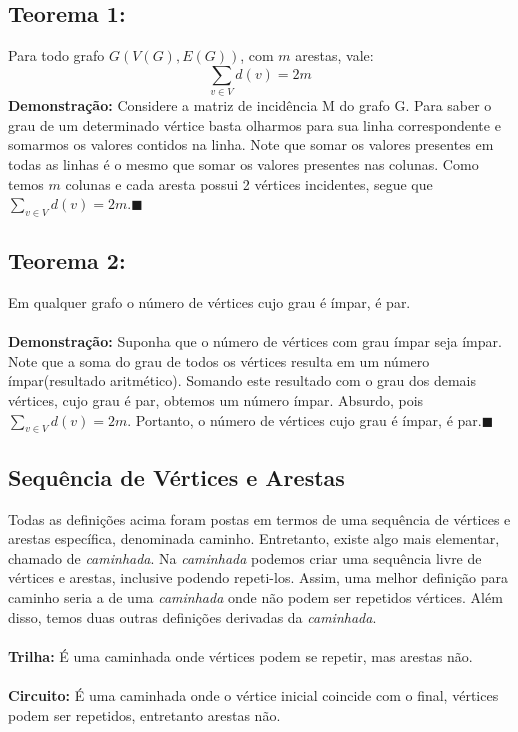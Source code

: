\documentclass[a4paper,12pt]{article}
\begin{document}
	\subsection*{Teorema 1: } Para todo grafo $G(V(G),E(G))$, com $m$ arestas, vale:
	\begin{equation}
	\sum\limits_{v\in V}{d(v)=2m}
	\end{equation}
	\textbf{Demonstração: }Considere a matriz de incidência M do grafo G. Para saber o grau de um determinado vértice basta olharmos para sua linha correspondente e somarmos os valores contidos na linha. Note que somar os valores presentes em todas as linhas é o mesmo que somar os valores presentes nas colunas. Como temos $m$ colunas e cada aresta possui 2 vértices incidentes, segue que $\sum\limits_{v\in V}{d(v)=2m}$.\hfill$\blacksquare$
	
	\subsection*{Teorema 2: }Em qualquer grafo o número de vértices cujo grau é ímpar, é par.
	\\
	\\
	\textbf{Demonstração: }Suponha que o número de vértices com grau ímpar seja ímpar. Note que a soma do grau de todos os vértices resulta em um número ímpar(resultado aritmético). Somando este resultado com o grau dos demais vértices, cujo grau é par, obtemos um número ímpar. Absurdo, pois $\sum\limits_{v\in V}{d(v)=2m}$. Portanto, o número de vértices cujo grau é ímpar, é par.\hfill$\blacksquare$
	
	\subsection{Sequência de Vértices e Arestas}
	Todas as definições acima foram postas em termos de uma sequência de vértices e arestas específica, denominada caminho. Entretanto, existe algo mais elementar, chamado de \textit{caminhada}. Na \textit{caminhada} podemos criar uma sequência livre de vértices e arestas, inclusive podendo repeti-los. Assim, uma melhor definição para caminho seria a de uma \textit{caminhada} onde não podem ser repetidos vértices. Além disso, temos duas outras definições derivadas da \textit{caminhada}.
	\\
	\\
	\textbf{Trilha: }É uma caminhada onde vértices podem se repetir, mas arestas não.
	\\
	\\
	\textbf{Circuito: }É uma caminhada onde o vértice inicial coincide com o final, vértices podem ser repetidos, entretanto arestas não.
\end{document}
